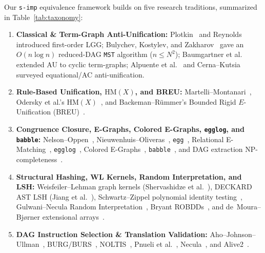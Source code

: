 \documentclass[11pt,a4paper]{article}
\begin{document}
Our \texttt{s-imp} equivalence framework builds on five research traditions, summarized in Table~\ref{tab:taxonomy}:
\begin{enumerate}
  \item \textbf{Classical \& Term-Graph Anti-Unification:} Plotkin~\cite{plotkin1970} and Reynolds~\cite{reynolds1970} introduced first-order LGG; Bulychev, Kostylev, and Zakharov~\cite{bulychev2009} gave an $O(n \log n)$ reduced-DAG \texttt{MST} algorithm ($n \le N^2$); Baumgartner et al.~\cite{baumgartner2018} extended AU to cyclic term-graphs; Alpuente et al.~\cite{alpuente2014} and Cerna--Kutsia~\cite{cerna2023} surveyed equational/AC anti-unification.
  \item \textbf{Rule-Based Unification, $\mathrm{HM}(X)$, and BREU:} Martelli--Montanari~\cite{martelli1982}, Odersky et al.'s $\mathrm{HM}(X)$~\cite{odersky1999}, and Backeman--R\"ummer's Bounded Rigid $E$-Unification (BREU)~\cite{backeman2015}.
  \item \textbf{Congruence Closure, E-Graphs, Colored E-Graphs, \texttt{egglog}, and \texttt{babble}:} Nelson--Oppen~\cite{nelson1979,nelson1980}, Nieuwenhuis--Oliveras~\cite{nieuwenhuis2005}, \texttt{egg}~\cite{willsey2021}, Relational E-Matching~\cite{zhang2022}, \texttt{egglog}~\cite{zhang2023egglog}, Colored E-Graphs~\cite{singher2023}, \texttt{babble}~\cite{cao2023}, and DAG extraction NP-completeness~\cite{zhang2023extract}.
  \item \textbf{Structural Hashing, WL Kernels, Random Interpretation, and LSH:} Weisfeiler--Lehman graph kernels (Shervashidze et al.~\cite{shervashidze2011}), DECKARD AST LSH (Jiang et al.~\cite{jiang2007}), Schwartz--Zippel polynomial identity testing~\cite{schwartz1980}, Gulwani--Necula Random Interpretation~\cite{gulwani2003}, Bryant ROBDDs~\cite{bryant1986}, and de~Moura--Bj\o rner extensional arrays~\cite{demoura2009}.
  \item \textbf{DAG Instruction Selection \& Translation Validation:} Aho--Johnson--Ullman~\cite{aho1977}, BURG/BURS~\cite{fraser1992,proebsting1995}, NOLTIS~\cite{koes2008}, Pnueli et al.~\cite{pnueli1998}, Necula~\cite{necula2000}, and Alive2~\cite{lopes2021}.
\end{enumerate}
\end{document}
